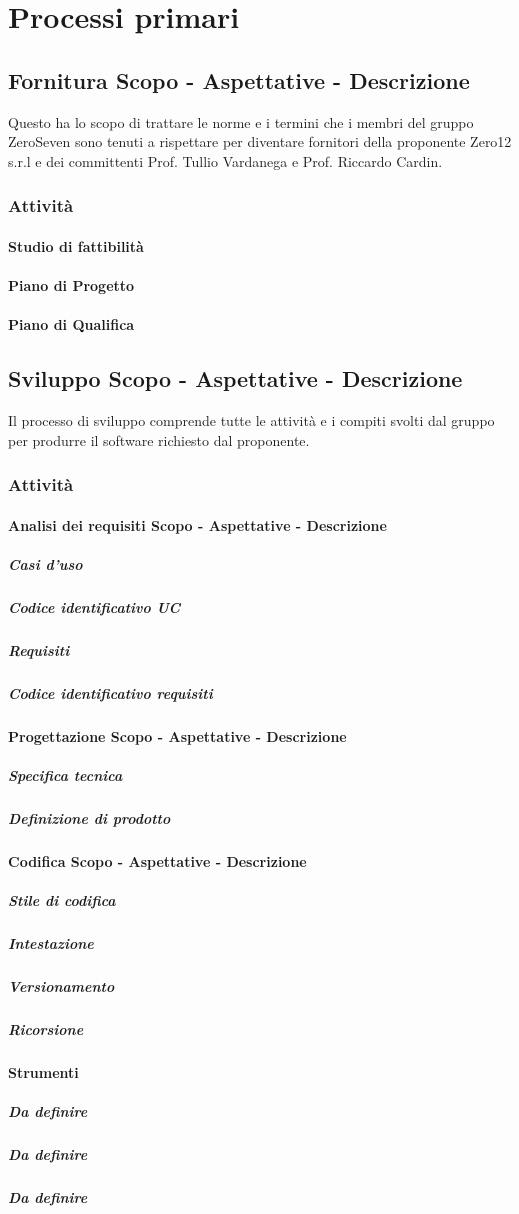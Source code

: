 \section{Processi primari}
\subsection{Fornitura Scopo - Aspettative - Descrizione}			
Questo  ha lo scopo di trattare le norme e i termini che i membri del gruppo ZeroSeven sono tenuti a rispettare per diventare fornitori della proponente Zero12 s.r.l e dei committenti Prof. Tullio Vardanega e Prof. Riccardo Cardin.

\subsubsection{Attività}
\paragraph{Studio di fattibilità}

\paragraph{Piano di Progetto}

\paragraph{Piano di Qualifica}

\subsection{Sviluppo Scopo - Aspettative - Descrizione}
Il processo di sviluppo comprende tutte le attività e i compiti svolti dal gruppo per produrre il software richiesto dal proponente.

\subsubsection{Attività}
\paragraph{Analisi dei requisiti Scopo - Aspettative - Descrizione}
\subparagraph{Casi d'uso}
\subparagraph{Codice identificativo UC}
\subparagraph{Requisiti}
\subparagraph{Codice identificativo requisiti}
\paragraph{Progettazione Scopo - Aspettative - Descrizione}
\subparagraph{Specifica tecnica}
\subparagraph{Definizione di prodotto}
\paragraph{Codifica Scopo - Aspettative - Descrizione}
\subparagraph{Stile di codifica}
\subparagraph{Intestazione}
\subparagraph{Versionamento}
\subparagraph{Ricorsione}
\paragraph{Strumenti}
\subparagraph{Da definire}
\subparagraph{Da definire}
\subparagraph{Da definire}



